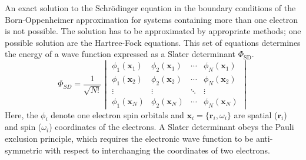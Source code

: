 An exact solution to the Schr\"odinger equation in the boundary conditions of
the Born-Oppenheimer approximation for systems containing more than one
electron is not possible. The solution has to be approximated by appropriate
methods; one possible solution are the Hartree-Fock equations. This set of
equations determines the energy of a wave function expressed as a Slater
determinant $\Phi_\text{SD}$.
%
\begin{equation}
     \Phi_{SD}=\frac{1}{\sqrt{N!}}
     \begin{vmatrix}
         \phi_1(\mathbf{x}_1) & \phi_2(\mathbf{x}_1) & \cdots & \phi_N(\mathbf{x}_1)\\
         \phi_1(\mathbf{x}_2) & \phi_2 (\mathbf{x}_2) & \cdots & \phi_N(\mathbf{x}_2)\\
         \vdots & \vdots & \ddots & \vdots\\
         \phi_1(\mathbf{x}_N) & \phi_2(\mathbf{x}_N) & \cdots & \phi_N(\mathbf{x}_N)
     \end{vmatrix}
     \label{eqn:SlaterDet}
\end{equation}
%
Here, the $\phi_i$ denote one electron spin orbitals and
$\mathbf{x}_i=\{\mathbf{r}_i,\omega_i\}$ are spatial ($\mathbf{r}_i$) and spin
($\omega_i$) coordinates of the electrons. A Slater determinant obeys the Pauli
exclusion principle, which requires the electronic wave function to be
anti-symmetric with respect to interchanging the coordinates of two electrons.

